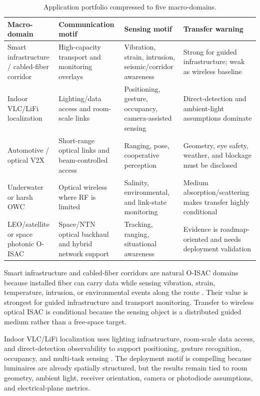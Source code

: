 \documentclass[letterpaper,journal]{IEEEtran}
\begin{document}
\begin{table}[!t]
    \caption{Application portfolio compressed to five macro-domains.}
    \label{tab:section7_portfolio}
    \centering
    \scriptsize
    \setlength{\tabcolsep}{2.8pt}
    \renewcommand{\arraystretch}{1.08}
    \begin{tabularx}{\textwidth}{@{}L{2.35cm}L{2.6cm}L{2.55cm}X@{}}
        \toprule
        Macro-domain & Communication motif & Sensing motif & Transfer warning \\
        \midrule
        Smart infrastructure / cabled-fiber corridor & High-capacity transport and monitoring overlays & Vibration, strain, intrusion, seismic/corridor awareness & Strong for guided infrastructure; weak as wireless baseline \\
        Indoor VLC/LiFi localization & Lighting/data access and room-scale links & Positioning, gesture, occupancy, camera-assisted sensing & Direct-detection and ambient-light assumptions dominate \\
        Automotive / optical V2X & Short-range optical links and beam-controlled access & Ranging, pose, cooperative perception & Geometry, eye safety, weather, and blockage must be disclosed \\
        Underwater or harsh OWC & Optical wireless where RF is limited & Salinity, environmental, and link-state monitoring & Medium absorption/scattering makes transfer highly conditional \\
        LEO/satellite or space photonic O-ISAC & Space/NTN optical backhaul and hybrid network support & Tracking, ranging, situational awareness & Evidence is roadmap-oriented and needs deployment validation \\
        \bottomrule
    \end{tabularx}
\end{table}

Smart infrastructure and cabled-fiber corridors are natural O-ISAC domains because installed fiber can carry data while sensing vibration, strain, temperature, intrusion, or environmental events along the route \cite{O_ISAC_013,O_ISAC_020,O_ISAC_038,O_ISAC_064,O_ISAC_069,O_ISAC_074}. Their value is strongest for guided infrastructure and transport monitoring. Transfer to wireless optical ISAC is conditional because the sensing object is a distributed guided medium rather than a free-space target.

Indoor VLC/LiFi localization uses lighting infrastructure, room-scale data access, and direct-detection observability to support positioning, gesture recognition, occupancy, and multi-task sensing \cite{O_ISAC_009,O_ISAC_011,O_ISAC_022,O_ISAC_030,O_ISAC_039,O_ISAC_050,O_ISAC_054,O_ISAC_060}. The deployment motif is compelling because luminaires are already spatially structured, but the results remain tied to room geometry, ambient light, receiver orientation, camera or photodiode assumptions, and electrical-plane metrics.
\end{document}
